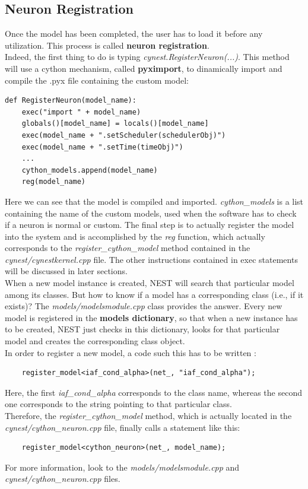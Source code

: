 \documentclass{article}
\begin{document}
\subsection{Neuron Registration}
Once the model has been completed, the user has to load it before any utilization. This process is called \textbf{neuron registration}.\\
Indeed, the first thing to do is typing \emph{cynest.RegisterNeuron(...)}. This method will use a cython mechanism, called \textbf{pyximport}, to dinamically import and compile the .pyx file containing the custom model:
\begin{verbatim}
def RegisterNeuron(model_name):
    exec("import " + model_name)
    globals()[model_name] = locals()[model_name]
    exec(model_name + ".setScheduler(schedulerObj)")
    exec(model_name + ".setTime(timeObj)")
    ...
    cython_models.append(model_name)
    reg(model_name)
\end{verbatim}
Here we can see that the model is compiled and imported. \emph{cython\_models} is a list containing the name of the custom models, used when the software has to check if a neuron is normal or custom. The final step is to actually register the model into the system and is accomplished by the \emph{reg} function, which actually corresponds to the \emph{register\_cython\_model} method contained in the \emph{cynest/cynestkernel.cpp} file. The other instructions contained in exec statements will be discussed in later sections. \\

When a new model instance is created, NEST will search that particular model among its classes. But how to know if a model has a corresponding class (i.e., if it exists)? The \emph{models/modelsmodule.cpp} class provides the answer. Every new model is registered in the \textbf{models dictionary}, so that when a new instance has to be created, NEST just checks in this dictionary, looks for that particular model and creates the corresponding class object.\\
In order to register a new model, a code such this has to be written :
\begin{verbatim}
	register_model<iaf_cond_alpha>(net_, "iaf_cond_alpha");
\end{verbatim}
Here, the first \emph{iaf\_cond\_alpha} corresponds to the class name, whereas the second one corresponds to the string pointing to that particular class.\\
Therefore, the \emph{register\_cython\_model} method, which is actually located in the \emph{cynest/cython\_neuron.cpp} file, finally calls a statement like this:
\begin{verbatim}
	register_model<cython_neuron>(net_, model_name);
\end{verbatim}
For more information, look to the \emph{models/modelsmodule.cpp} and \emph{cynest/cython\_neuron.cpp} files.
\end{document}
